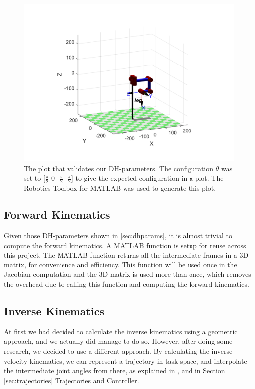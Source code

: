 \documentclass[letterpaper, 10 pt, conference]{ieeeconf}  %
\begin{document}
\begin{figure}[thpb]
    \parbox{\linewidth}{\includegraphics[width=\linewidth]{dhvalidation.png}}
    \caption{The plot that validates our DH-parameters. The configuration $\theta$ was set to [$\frac{\pi}{2}$ 0 -$\frac{\pi}{2}$ -$\frac{\pi}{2}$] to give the expected configuration in a plot. The Robotics Toolbox for MATLAB was used to generate this plot.}
    \label{fig:dhvalidation}
\end{figure}

\subsection{Forward Kinematics}
Given those DH-parameters shown in \ref{sec:dhparams}, it is almost trivial to compute the forward kinematics. A MATLAB function is setup for reuse across this project. The MATLAB function returns all the intermediate frames in a 3D matrix, for convenience and efficiency. This function will be used once in the Jacobian computation and the 3D matrix is used more than once, which removes the overhead due to calling this function and computing the forward kinematics.

\subsection{Inverse Kinematics}
At first we had decided to calculate the inverse kinematics using a geometric approach, and we actually did manage to do so. However, after doing some research, we decided to use a different approach. By calculating the inverse velocity kinematics, we can represent a trajectory in task-space, and interpolate the intermediate joint angles from there, as explained in \cite{spong2006robot}, and in Section \ref{sec:trajectories} Trajectories and Controller.
\end{document}
